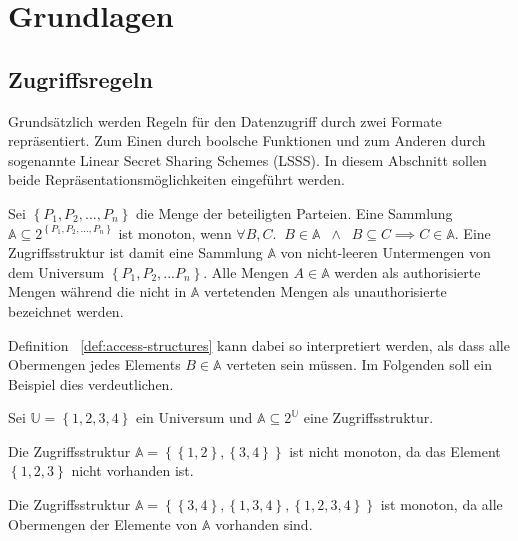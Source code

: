 \section{Grundlagen}
\subsection{Zugriffsregeln}
Grundsätzlich werden Regeln für den Datenzugriff durch zwei Formate
repräsentiert. Zum Einen durch boolsche Funktionen und zum Anderen durch
sogenannte Linear Secret Sharing Schemes (LSSS). In diesem Abschnitt sollen
beide Repräsentationsmöglichkeiten eingeführt werden.

\begin{definition}\label{def:access-structures}
	Sei $\left\{ P_1, P_2, ..., P_n \right\}$ die Menge der beteiligten
	Parteien. Eine Sammlung $\mathbb{A} \subseteq 2^{\left\{ P_1, P_2, ..., P_n
	\right\}}$ ist monoton, wenn $\forall B, C .\;\; B \in \mathbb{A}
	\;\;\land\;\; B \subseteq C \implies C \in \mathbb{A}$. Eine
	Zugriffsstruktur ist damit eine Sammlung $\mathbb{A}$ von nicht-leeren
	Untermengen von dem Universum $\left\{ P_1, P_2, ... P_n \right\}$. Alle
	Mengen $A \in \mathbb{A}$ werden als authorisierte Mengen während
	die nicht in $\mathbb{A}$ vertetenden Mengen als unauthorisierte
	bezeichnet werden.
\end{definition}

Definition ~\ref{def:access-structures} kann dabei so interpretiert werden,
als dass alle Obermengen jedes Elements $B \in \mathbb{A}$ verteten sein
müssen. Im Folgenden soll ein Beispiel dies verdeutlichen.

\begin{example}
	Sei $\mathbb{U} = \left\{ 1, 2, 3, 4 \right\}$ ein Universum und $\mathbb{A}
	\subseteq 2^\mathbb{U}$ eine Zugriffsstruktur.

	Die Zugriffsstruktur $\mathbb{A} = \left\{ \left\{1,2\right\},
	\left\{3,4\right\} \right\}$ ist nicht monoton, da das Element
	$\left\{1,2,3\right\}$ nicht vorhanden ist.

	Die Zugriffsstruktur $\mathbb{A} = \left\{ \left\{3,4\right\},
	\left\{1,3,4\right\}, \left\{1,2,3,4\right\} \right\}$ ist monoton, da alle
	Obermengen der Elemente von $\mathbb{A}$ vorhanden sind.
\end{example}


